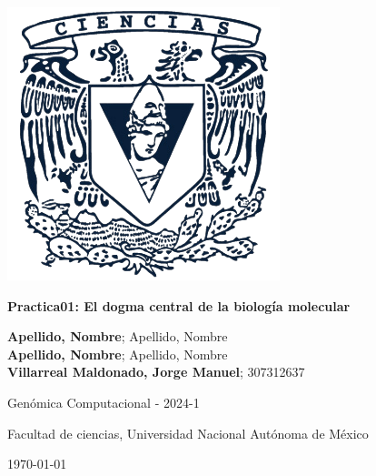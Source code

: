 \hfill
\begin{minipage}{0.18\textwidth}
    \includegraphics[width=\textwidth]{figuras/facultad-de-ciencias.png} %
\end{minipage}
\hspace{25pt}
\begin{minipage}{0.75\textwidth}

    \Large{\textbf{Practica01: El dogma central de la biología molecular}} %
    \vspace{4mm}
    
    \large{\textbf{Apellido, Nombre}; Apellido, Nombre} \\
    \large{\textbf{Apellido, Nombre}; Apellido, Nombre} \\
    \large{\textbf{Villarreal Maldonado, Jorge Manuel}; 307312637}
    \vspace{2mm}
    
    Genómica Computacional - 2024-1 
    
    Facultad de ciencias, Universidad Nacional Autónoma de México 
    \vspace{1mm} 
    
    \today %

\end{minipage}